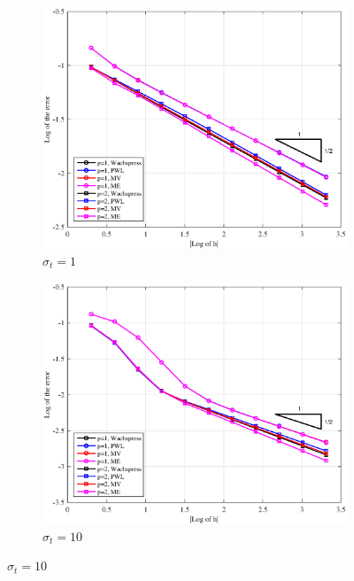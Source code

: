\begin{figure}
\centering
{
	\begin{subfigure}[b]{0.485\textwidth}
		\centering
		\label{subfig::PA_Left_Cart_sig1}
		\includegraphics[width=\textwidth]{figures/sec_BF/PAErr_Left_Cart_sig1.eps}
	\caption{$\sigma_t = 1$}
	\end{subfigure}
	\hfill
	\begin{subfigure}[b]{0.485\textwidth}
		\centering
		\label{subfig::PA_Left_Cart_sig10}
		\includegraphics[width=\textwidth]{figures/sec_BF/PAErr_Left_Cart_sig10.eps}
	\caption{$\sigma_t = 10$}
	\end{subfigure}
}
\end{figure}
